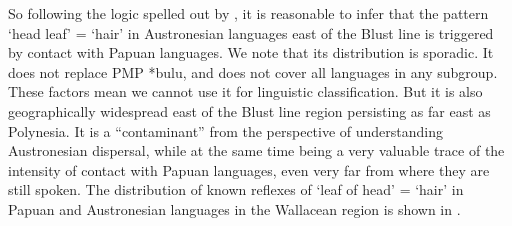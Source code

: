 So following the logic spelled out by \citet[14--16]{Klamer2019},
it is reasonable to infer that the pattern ‘head leaf’ = ‘hair’
in Austronesian languages east of the Blust line is triggered
by contact with Papuan languages.
We note that its distribution is sporadic.
It does not replace PMP *bulu,
and does not cover all languages in any subgroup.
These factors mean we cannot use it for linguistic classification.
But it is also geographically widespread east of the Blust line
region persisting as far east as Polynesia.
It is a “contaminant” from the perspective of understanding Austronesian
dispersal, while at the same time being a very valuable trace of the intensity
of contact with Papuan languages,
even very far from where they are still spoken.
The distribution of known reflexes of ‘leaf of head’ = ‘hair’
in Papuan and Austronesian languages in the Wallacean region is shown in
.
